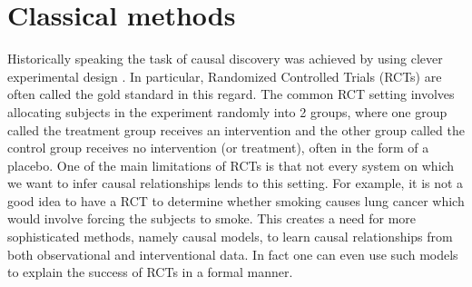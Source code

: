 \documentclass{tufte-book}
\begin{document}
\section{Classical methods}
\label{sec:org14cc4aa}
Historically speaking the task of causal discovery was achieved by using clever experimental design \cite{fisher-1935}. In particular, Randomized Controlled Trials (RCTs) are often called the gold standard in this regard. The common RCT setting involves allocating subjects in the experiment randomly into 2 groups, where one group called the treatment group receives an intervention and the other group called the control group receives no intervention (or treatment), often in the form of a placebo. One of the main limitations of RCTs is that not every system on which we want to infer causal relationships lends to this setting. For example, it is not a good idea to have a RCT to determine whether smoking causes lung cancer which would involve forcing the subjects to smoke. This creates a need for more sophisticated methods, namely causal models, to learn causal relationships from both observational and interventional data. In fact one can even use such models to explain the success of RCTs in a formal manner.
\end{document}
